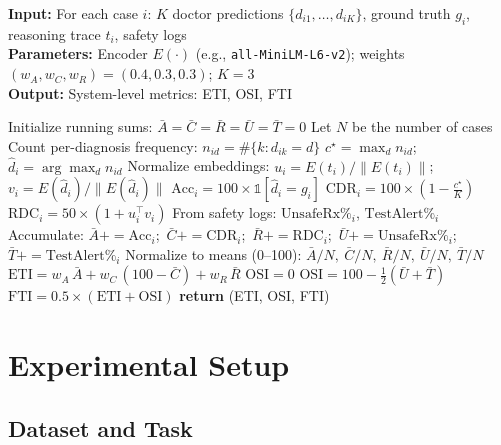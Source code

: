 \documentclass[letterpaper]{article} %
\begin{document}
\begin{algorithm}[t]
\caption{Computation of Trust Metrics. 
This algorithm formalizes the derivation of Epistemic (ETI), Operational (OSI), and Final (FTI) Trust Indices.}
\label{alg:trustmetrics}
\textbf{Input:} For each case $i$: $K$ doctor predictions $\{d_{i1},\dots,d_{iK}\}$, ground truth $g_i$, reasoning trace $t_i$, safety logs\\
\textbf{Parameters:} Encoder $E(\cdot)$ (e.g., \texttt{all-MiniLM-L6-v2}); weights $(w_A,w_C,w_R)=(0.4,0.3,0.3)$; $K{=}3$\\
\textbf{Output:} System-level metrics: ETI, OSI, FTI
\begin{algorithmic}[1]
\STATE Initialize running sums: $\bar{A}=\bar{C}=\bar{R}=\bar{U}=\bar{T}=0$
\STATE Let $N$ be the number of cases
    \STATE Count per-diagnosis frequency: $n_{id}=\#\{k : d_{ik}=d\}$
    \STATE $c^\star = \max_d n_{id}$;\quad $\hat{d}_i = \arg\max_d n_{id}$ 
    \STATE Normalize embeddings: $u_i=E(t_i)/\|E(t_i)\|$;\quad $v_i=E(\hat{d}_i)/\|E(\hat{d}_i)\|$
    \STATE $\mathrm{Acc}_i = 100 \times \mathbb{1}[\hat{d}_i=g_i]$
    \STATE $\mathrm{CDR}_i = 100 \times \left(1 - \frac{c^\star}{K}\right)$ 
    \STATE $\mathrm{RDC}_i = 50 \times (1 + u_i^\top v_i)$ 
    \STATE From safety logs: $\mathrm{UnsafeRx\%}_i$, $\mathrm{TestAlert\%}_i$
    \STATE Accumulate: $\bar{A}{+}{=}\mathrm{Acc}_i$;\ $\bar{C}{+}{=}\mathrm{CDR}_i$;\ $\bar{R}{+}{=}\mathrm{RDC}_i$;\ 
    $\bar{U}{+}{=}\mathrm{UnsafeRx\%}_i$;\ $\bar{T}{+}{=}\mathrm{TestAlert\%}_i$
\ENDFOR
\STATE Normalize to means (0--100): $\bar{A}/N,\ \bar{C}/N,\ \bar{R}/N,\ \bar{U}/N,\ \bar{T}/N$
\STATE $\mathrm{ETI} = w_A\,\bar{A} + w_C\,(100{-}\bar{C}) + w_R\,\bar{R}$
\IF{ safety agents inactive }
    \STATE $\mathrm{OSI} = 0$
\ELSE
    \STATE $\mathrm{OSI} = 100 - \tfrac{1}{2}(\bar{U} + \bar{T})$
\ENDIF
\STATE $\mathrm{FTI} = 0.5 \times (\mathrm{ETI} + \mathrm{OSI})$
\STATE \textbf{return} (ETI, OSI, FTI)
\end{algorithmic}
\end{algorithm}

\section{Experimental Setup}
\label{sec:setup}

\subsection{Dataset and Task}
\end{document}
